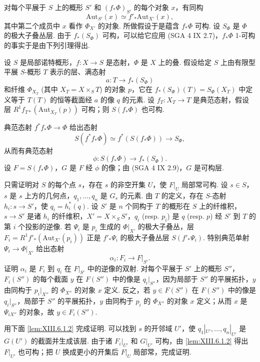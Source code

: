 对每个平展于 $S$ 上的概形 $S'$ 和 $(f_* \Phi)_{S'}$ 的每个对象 $x$，有同构
\[
\mathrm{Aut}_{S'}(x) \simeq f'_* \mathrm{Aut}_{X'}(x),
\]
其中第二个成员中 $x$ 看作 $\Phi_{X'}$ 的对象. 所做假设于是蕴含 $f_* \Phi$ 可构. 设 $S_\Phi$ 是 $\Phi$ \cite[III 2.1.7]{exp13-1} 的极大子叠丛层. 由于 $f_*(S_\Phi)$ 可构，可以给它应用 (SGA 4 IX 2.7)，$f_* \Phi$ 1-可构的事实于是由下列引理得出.

\begin{lemma}\label{lem:XIII.6.1.1}
设 $S$ 是局部诺特概形，$f \colon X \to S$ 是态射，$\Phi$ 是 $X$ 上的叠. 假设给定 $S$ 上由有限型平展 $S$-概形 $T$ 表示的层、满态射
\[
a \colon T \longrightarrow f_*(S_\Phi)
\]
和纤维 $\Phi_{X_T}$ (其中 $X_T = X \times_S T$) 的对象 $p$，它在 $f_*(S_\Phi)(T) = S_\Phi(X_T)$ 中定义等于 $T(T)$ 的恒等截面经 $a$ 的像 $q$ 的元素. 设 $f_T \colon X_T \to T$ 是典范态射，假设层 $R^1 f_{T*}(\mathrm{Aut}_{X_T}(p))$ 可构；则 $S(f_* \Phi)$ 也可构.
\end{lemma}

典范态射 $f^{*} f_* \Phi \to \Phi$ 给出态射
\[
S(f^{*} f_* \Phi) \simeq f^{*}(S(f_* \Phi)) \longrightarrow S_\Phi,
\]
从而有典范态射
\[
\phi \colon S(f_* \Phi) \longrightarrow f_*(S_\Phi).
\]
设 $F = S(f_* \Phi)$，$G$ 是 $F$ 经 $\phi$ 的像；由 (SGA 4 IX 2.9)，$G$ 是可构层.

只需证明对 $S$ 的每个点 $s$，存在 $s$ 的非空开集 $U$，使 $F|_U$ 局部常可构. 设 $s \in S$，$s$ 是 $s$ 上方的几何点，$q_1, \ldots, q_n$ 是 $G_s$ 的元素. 由 $T$ 的定义，存在 $S$-态射 $h_i \colon s \to S'$，使 $q_i = h^{*}_i(q)$. 设 $S'$ 是 $n$ 个同构于 $T$ 的概形在 $S$ 上的纤维积，$s \to S'$ 是诸 $h_i$ 的纤维积，$X' = X \times_S S'$，$q_i$ (resp. $p_i$) 是 $q$ (resp. $p$) 经 $S'$ 到 $T$ 的第 $i$ 个投影的逆像. 若 $\Psi_i$ 是 $p_i$ 生成的 $\Phi|_{X'}$ 的极大子叠丛，层 $F_i = R^1 f'_*(\mathrm{Aut}_{X'}(p_i))$ 正是 $f'_* \Psi_i$ 的极大子叠丛层 $S(f'_* \Psi_i)$. 特别典范单射 $\Psi_i \to \Phi|_{X'}$ 给出态射
\[
\alpha_i \colon F_i \longrightarrow F|_{S'}.
\]
证明 $\alpha_i$ 是 $F_i$ 到 $q_i$ 在 $F|_{S'}$ 中的逆像的双射. 对每个平展于 $S'$ 上的概形 $S''$，$F_i(S'')$ 的每个截面 $y$ 在 $F(S'')$ 中的像是 $q_i|_{S''}$，因为局部于 $S''$ 的平展拓扑，$y$ 由同构于 $p_i|_{X''}$ 的 $\Phi_{X''}$ 的对象 $x$ 定义. 反之，若 $y \in F(S'')$ 在 $F(S'')$ 中的像是 $q_i|_{S''}$，局部于 $S''$ 的平展拓扑，$y$ 由同构于 $p_i$ 的 $\Phi_{X''}$ 的对象 $x$ 定义；从而 $x$ 是 $\Psi_{iX''}$ 的对象，故 $y \in F_i(S'')$.

用下面 \ref{lem:XIII.6.1.2} 完成证明. 可以找到 $s$ 的开邻域 $U'$，使 $q_1|_{U'}, \ldots, q_n|_{U'}$ 是 $G(U')$ 的截面并生成该层. 由于诸 $F_i|_{U'}$ 和 $G|_{U'}$ 可构，由 \ref{lem:XIII.6.1.2} 得出 $F|_{U'}$ 也可构；把 $U$ 换成更小的开集后 $F|_U$ 局部常，完成证明.

